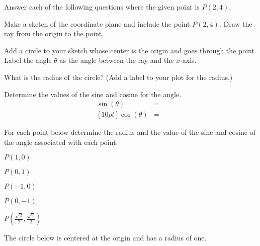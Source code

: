 \begin{problem}
\item Answer each of the following questions where the given point is $P(2,4)$.
  \begin{subproblem}
  \item Make a sketch of the coordinate plane and include the point
    $P(2,4)$. Draw the ray from the origin to the point.
    \vfill
  \item Add a circle to your sketch whose center is the origin and goes
    through the point. Label the angle $\theta$ as the angle between
    the ray and the $x$-axis.
  \item What is the radius of the circle? (Add a label to your plot for the radius.)
    \vspace{2em}
  \item Determine the values of the sine and cosine for the angle.
    \begin{eqnarray*}
      \sin(\theta) & = & \\ [10pt]
      \cos(\theta) & = &
    \end{eqnarray*}
  \end{subproblem}

\clearpage

\item For each point below determine the radius and the value of the
  sine and cosine of the angle associated with each point.
  \begin{subproblem}
  \item $P(1,0)$
    \vfill
  \item $P(0,1)$
    \vfill
  \item $P(-1,0)$
    \vfill
  \item $P(0,-1)$
    \vfill
  \item $P\left(\frac{\sqrt{2}}{2},\frac{\sqrt{2}}{2}\right)$
    \vfill
  \end{subproblem}

\clearpage

\item The circle below is centered at the origin and has a radius of
  one.



\end{problem}
